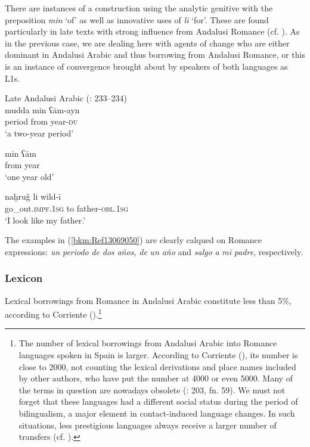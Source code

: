 \documentclass[output=paper,modfonts,nonflat]{langsci/langscibook}
\begin{document}
There are instances of a construction using the analytic genitive with the preposition \textit{min} ‘of’ as well as innovative uses of \textit{li} ‘for’. These are found particularly in late texts with strong influence from Andalusi Romance (cf. \citealt{Corriente2012}). As in the previous case, we are dealing here with agents of change who are either dominant in Andalusi Arabic and thus borrowing from Andalusi Romance, or this is an instance of convergence brought about by speakers of both languages as L1s.


\ea\label{bkm:Ref13069050}
Late Andalusi Arabic (\citealt{CorrientePereiraVicente2015}: 233–234)\\
\ea \gll mudda min ʕām-ayn\\
     period from year-\textsc{du}\\
\glt ‘a two-year period’



\ex\label{ex:key:}
\gll min ʕām\\
     from year\\
\glt ‘one year old’



\ex\label{ex:key:}
\gll naḫruǧ li wild-ī\\
  go\_out.\textsc{impf.1sg} to father-\textsc{obl.1sg}\\
\glt ‘I look like my father.’
\z
\z

The examples in (\ref{bkm:Ref13069050}) are clearly calqued on Romance expressions: \textit{un} \textit{periodo} \textit{de} \textit{dos} \textit{años,} \textit{de} \textit{un} \textit{año} and \textit{salgo} \textit{a} \textit{mi} \textit{padre}, respectively. 
 
\subsubsection{Lexicon}




Lexical borrowings from Romance in Andalusi Arabic constitute less than 5\%, according to Corriente (\citeyear[142]{Corriente1992book}).\footnote{The number of lexical borrowings from Andalusi Arabic into Romance languages spoken in Spain is larger. According to Corriente (\citeyear{Corriente2005}), its number is close to 2000, not counting the lexical derivations and place names included by other authors, who have put the number at 4000 or even 5000. Many of the terms in question are nowadays obsolete (\citealt{Corriente2005}: 203, fn. 59). We must not forget that these languages had a different social status during the period of bilingualism, a major element in contact-induced language changes. In such situations, less prestigious languages always receive a larger number of transfers (cf.  \citealt{CorrientePereiraVicente2019}).} 
\end{document}
